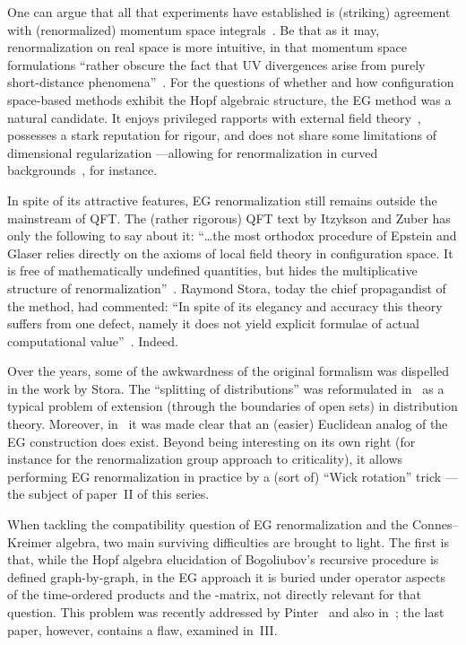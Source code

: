 \documentclass[a4paper,12pt]{article}
\providecommand{\Sf}{\mathbb{S}}       %
\providecommand{\7}{\dagger}           %
\theoremstyle{plain}
\theoremstyle{definition}
\begin{document}
One can argue that all that experiments have established is (striking)
agreement with (renormalized) momentum space
integrals~\cite{Martinus}. Be that as it may, renormalization on real
space is more intuitive, in that momentum space formulations ``rather
obscure the fact that UV divergences arise from purely short-distance
phenomena''~\cite{Collins}. For the questions of whether and how
configuration space-based methods exhibit the Hopf algebraic
structure, the EG method was a natural candidate. It enjoys privileged
rapports with external field
theory~\cite{HeidelbergTrier,Bellissard,Halley}, possesses a stark
reputation for rigour, and does not share some limitations of
dimensional regularization ---allowing for renormalization in curved
backgrounds~\cite{BrFr}, for instance.

In spite of its attractive features, EG renormalization still remains
outside the mainstream of QFT. The (rather rigorous) QFT text by
Itzykson and Zuber has only the following to say about it: ``\dots the
most orthodox procedure of Epstein and Glaser relies directly on the
axioms of local field theory in configuration space. It is free of
mathematically undefined quantities, but hides the multiplicative
structure of renormalization''~\cite[p.~374]{IZ}. Raymond Stora, today
the chief propagandist of the method, had commented: ``In spite of its
elegancy and accuracy this theory suffers from one defect, namely it
does not yield explicit formulae of actual computational
value''~\cite{LagrSt}. Indeed.

Over the years, some of the awkwardness of the original formalism was
dispelled in the work by Stora. The ``splitting of distributions'' was
reformulated in~\cite{PoSt} as a typical problem of extension (through
the boundaries of open sets) in distribution theory. Moreover,
in~\cite{EllipticSt} it was made clear that an (easier) Euclidean
analog of the EG construction does exist. Beyond being interesting on
its own right (for instance for the renormalization group approach to
criticality), it allows performing EG renormalization in practice by a
(sort of) ``Wick rotation'' trick ---the subject of paper~II of this
series.

\smallskip

When tackling the compatibility question of EG renormalization and the
Connes--Kreimer algebra, two main surviving difficulties are brought
to light. The first is that, while the Hopf algebra elucidation of
Bogoliubov's recursive procedure is defined graph-by-graph, in the EG
approach it is buried under operator aspects of the time-ordered
products and the \myHighlight{$\Sf$}\coordHE{}-matrix, not directly relevant for that
question. This problem was recently addressed by
Pinter~\cite{Gudrunpaper,Gudrun} and also in~\cite{Etoile}; the last
paper, however, contains a flaw, examined in~III.
\end{document}
